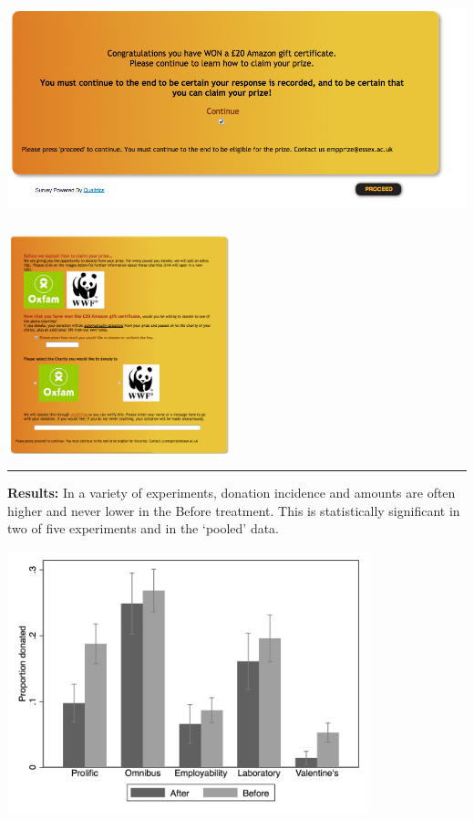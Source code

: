 \documentclass[]{article}
\begin{document}
\includegraphics[height=2.5in]{picsfigs/wonamazon.png}

\includegraphics[height=2.5in]{picsfigs/after_amazon.png}

\begin{center}\rule{0.5\linewidth}{\linethickness}\end{center}

\textbf{Results:} In a variety of experiments, donation incidence and
amounts are often higher and never lower in the Before treatment. This
is statistically significant in two of five experiments and in the
`pooled' data.

\includegraphics[height=3in]{picsfigs/BarGrDonpropHiBefore_vAfter.png}
\end{document}
